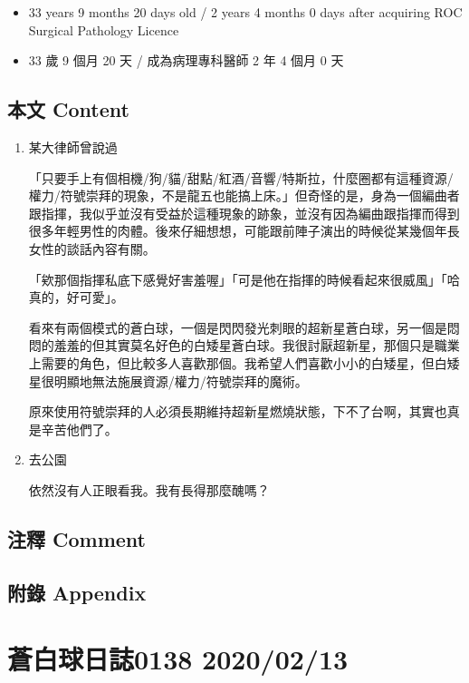 \documentclass[a5paper, 12pt
]{book}
\providecommand{\tightlist}{%
  \setlength{\itemsep}{0pt}\setlength{\parskip}{0pt}}
\begin{document}
\begin{itemize}
\tightlist
\item
  33 years 9 months 20 days old / 2 years 4 months 0 days after
  acquiring ROC Surgical Pathology Licence
\item
  33 歲 9 個月 20 天 / 成為病理專科醫師 2 年 4 個月 0 天
\end{itemize}

\hypertarget{ux672cux6587-content-73}{%
\subsection{本文 Content}\label{ux672cux6587-content-73}}

\begin{enumerate}
\def\labelenumi{\arabic{enumi}.}
\item
  某大律師曾說過

  「只要手上有個相機/狗/貓/甜點/紅酒/音響/特斯拉，什麼圈都有這種資源/權力/符號崇拜的現象，不是龍五也能搞上床。」但奇怪的是，身為一個編曲者跟指揮，我似乎並沒有受益於這種現象的跡象，並沒有因為編曲跟指揮而得到很多年輕男性的肉體。後來仔細想想，可能跟前陣子演出的時候從某幾個年長女性的談話內容有關。

  「欸那個指揮私底下感覺好害羞喔」「可是他在指揮的時候看起來很威風」「哈真的，好可愛」。

  看來有兩個模式的蒼白球，一個是閃閃發光刺眼的超新星蒼白球，另一個是悶悶的羞羞的但其實莫名好色的白矮星蒼白球。我很討厭超新星，那個只是職業上需要的角色，但比較多人喜歡那個。我希望人們喜歡小小的白矮星，但白矮星很明顯地無法施展資源/權力/符號崇拜的魔術。

  原來使用符號崇拜的人必須長期維持超新星燃燒狀態，下不了台啊，其實也真是辛苦他們了。
\item
  去公園

  依然沒有人正眼看我。我有長得那麼醜嗎？
\end{enumerate}

\hypertarget{ux6ce8ux91cb-comment-72}{%
\subsection{注釋 Comment}\label{ux6ce8ux91cb-comment-72}}

\hypertarget{ux9644ux9304-appendix-73}{%
\subsection{附錄 Appendix}\label{ux9644ux9304-appendix-73}}

\hypertarget{ux84bcux767dux7403ux65e5ux8a8c0138-20200213}{%
\section{蒼白球日誌0138
2020/02/13}\label{ux84bcux767dux7403ux65e5ux8a8c0138-20200213}}
\end{document}
